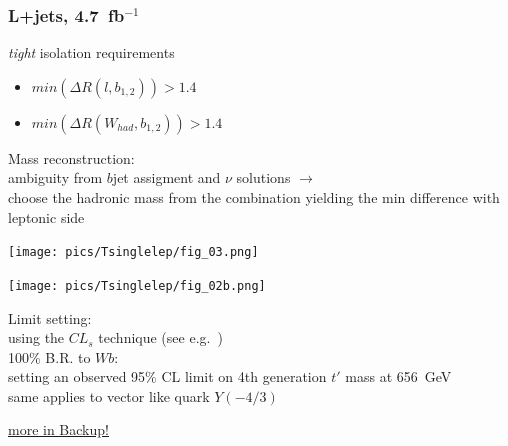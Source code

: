 \documentclass[xcolor=dvipsnames,10pt]{beamer}
\begin{document}
\begin{frame}\frametitle{L+jets, 4.7~fb$^{-1}$~\cite{ATLAS:2012qe}} %
\footnotesize\centering

\begin{minipage}{.5\textwidth}
\centering 

\textit{tight} isolation requirements

\scriptsize
\begin{itemize}
\item $min(\Delta R(l,b_{1,2})) > 1.4$
\item $min(\Delta R(W_{had},b_{1,2})) > 1.4$
\end{itemize}

Mass reconstruction:\\
ambiguity from $b$jet assigment and $\nu$ solutions $\rightarrow$\\
choose the hadronic mass from the combination yielding the min difference with leptonic side

\texttt{[image: pics/Tsinglelep/fig\_03.png]}

\end{minipage}\begin{minipage}{.5\textwidth}
\centering
\texttt{[image: pics/Tsinglelep/fig\_02b.png]}

Limit setting:\\
using the $CL_s$ technique (see e.g.~\cite{Junk:1999kv,Read:2002hq})\\

\vspace{\baselineskip}
 {\scriptsize 100\% B.R. to $Wb$}:\\
setting an observed 95\% CL limit on 4th generation $t'$ mass at \alert{656~GeV}\\
same applies to vector like quark $Y(-4/3)$


\end{minipage}

\begin{flushright}\scriptsize \hyperlink{Tsinglelep}{more in Backup!}\end{flushright}

\vspace{-\baselineskip}

\vspace{-\baselineskip}

\end{frame}
\end{document}
